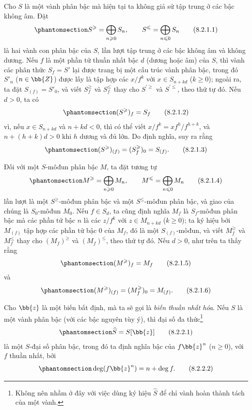 \documentclass[oneside,10pt]{amsart}
\renewcommand{\leq}{\leqslant}
\renewcommand{\geq}{\geqslant}
\newcommand{\oldpage}[2][]{\marginnote{\normalfont\footnotesize\textbf{#1}~|~#2}\ignorespaces}
\let\EGAOriginalLabel\label
\renewcommand{\label}[1]{\phantomsection\EGAOriginalLabel{#1}}
\begin{document}
\begin{env}[8.2.1]
\label{II.8.2.1}
Cho $S$ là một vành phân bậc mà hiện tại ta không giả sử tập trung ở các bậc không âm.
Đặt
\[
\label{II.8.2.1.1}
  S^\geq=\bigoplus_{n\geq0}S_n,
  \qquad
  S^\leq=\bigoplus_{n\leq0}S_n
\tag{8.2.1.1}
\]
là hai vành con phân bậc của $S$, lần lượt tập trung ở các bậc không âm và không dương.
Nếu $f$ là một phần tử thuần nhất bậc $d$ (dương hoặc âm) của $S$, thì vành các phân thức $S_f=S'$ lại được trang bị một cấu trúc vành phân bậc, trong đó $S'_n$ ($n\in\bb{Z}$) được lấy là tập hợp các $x/f^k$ với $x\in S_{n+kd}$ ($k\geq0$);
ngoài ra, ta đặt $S_{(f)}=S'_0$, và viết $S_f^\geq$ và $S_f^\leq$ thay cho $S^{\prime\geq}$ và $S^{\prime\leq}$, theo thứ tự đó.
Nếu $d>0$, ta có
\[
\label{II.8.2.1.2}
  (S^\geq)_f=S_f
\tag{8.2.1.2}
\]
vì, nếu $x\in S_{n+kd}$ và $n+kd<0$, thì có thể viết $x/f^k=xf^h/f^{h+k}$, và $n+(h+k)d>0$ khi $h$ dương và đủ lớn.
Do định nghĩa, suy ra rằng
\[
\label{II.8.2.1.3}
  (S^\geq)_{(f)}=(S_f^\geq)_0=S_{(f)}.
\tag{8.2.1.3}
\]

Đối với một $S$-môđun phân bậc $M$, ta đặt tương tự
\[
\label{II.8.2.1.4}
  M^\geq=\bigoplus_{n\geq0}M_n,
  \qquad
  M^\leq=\bigoplus_{n\leq0}M_n
\tag{8.2.1.4}
\]
lần lượt là một $S^\geq$-môđun phân bậc và một $S^\leq$-môđun phân bậc, và giao của chúng là $S_0$-môđun $M_0$.
Nếu $f\in S_d$, ta cũng định nghĩa $M_f$ là $S_f$-môđun phân bậc mà các phần tử bậc $n$ là các $z/f^k$ với $z\in M_{n+kd}$ ($k\geq0$);
ta ký hiệu bởi $M_{(f)}$ tập hợp các phần tử bậc $0$ của $M_f$, đó là một $S_{(f)}$-môđun, và viết $M_f^\geq$ và $M_f^\leq$ thay cho $(M_f)^\geq$ và $(M_f)^\leq$, theo thứ tự đó.
Nếu $d>0$, như trên ta thấy rằng
\[
\label{II.8.2.1.5}
  (M^\geq)_f=M_f
\tag{8.2.1.5}
\]
và
\[
\label{II.8.2.1.6}
  (M^\geq)_{(f)}=(M_f^\geq)_0=M_{(f)}.
\tag{8.2.1.6}
\]
\end{env}

\begin{env}[8.2.2]
\label{II.8.2.2}
Cho $\bb{z}$ là một biến bất định, mà ta sẽ gọi là \emph{biến thuần nhất hóa}.
Nếu $S$ là một vành phân bậc (với các bậc nguyên tùy ý), thì đại số đa thức\footnote{Không nên nhầm ở đây với việc dùng ký hiệu $\widehat{S}$ để chỉ vành hoàn thành tách của một vành.}
\[
\label{II.8.2.2.1}
  \widehat{S}=S[\bb{z}]
\tag{8.2.2.1}
\]
\oldpage[II]{158}
là một $S$-đại số phân bậc, trong đó ta định nghĩa bậc của $f\bb{z}^n$ ($n\geq0$), với $f$ thuần nhất, bởi
\[
\label{II.8.2.2.2}
  \deg(f\bb{z}^n)=n+\deg f.
\tag{8.2.2.2}
\]
\end{env}
\end{document}
